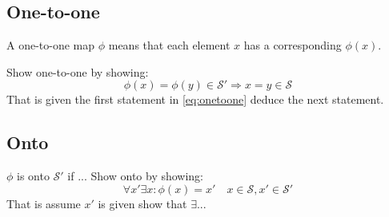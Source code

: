 \documentclass[a4paper,11pt]{kth-mag}
\renewcommand{\SS}{\ensuremath{\mathcal{S}}}
\begin{document}
\subsection{One-to-one}
\label{sec:onetoone}
A one-to-one map $\phi$ means that each element $x$ has a corresponding $\phi(x)$.

Show one-to-one by showing:
\begin{equation}
    \label{eq:onetoone}
    \phi(x)=\phi(y) \in\SS' \Rightarrow x=y \in\SS
\end{equation}
That is given the first statement in \eqref{eq:onetoone} deduce the next
statement.

\subsection{Onto}
\label{sec:onto}
$\phi$ is onto $\SS'$ if ...
Show onto by showing:
\begin{equation}
   \forall x'\exists x : \phi(x) = x' \quad x\in\SS,x'\in\SS'
\end{equation}
That is assume $x'$ is given show that $\exists ...$
\end{document}

